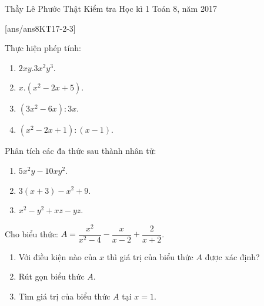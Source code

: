 \begin{name}
{Thầy  Lê Phước Thật}
{Kiểm tra Học kì 1 Toán 8, năm 2017}
\end{name}
\setcounter{ex}{0}
[ans/ans8KT17-2-3]

\begin{ex}%
Thực hiện phép tính:
\begin{enumerate}
\item $2xy.3x^2y^3$.
\item $x.(x^2-2x+5)$.
\item $(3x^2-6x):3x$.
\item $(x^2-2x+1):(x-1)$.
\end{enumerate}
\end{ex}

\begin{ex}%
Phân tích các đa thức sau thành nhân tử:
\begin{enumerate}
\item $5x^2y-10xy^2$.
\item $3(x + 3)-x^2+9$.
\item $x^2-y^2+xz-yz$.
\end{enumerate}
\end{ex}

\begin{ex}%
Cho biểu thức: $A=\dfrac{x^2}{x^2-4}-\dfrac{x}{x-2}+\dfrac{2}{x+2}$.
\begin{enumerate}
\item Với điều kiện nào của $x$ thì giá trị của biểu thức $A$ được xác định?
\item Rút gọn biểu thức $A$.
\item Tìm giá trị của biểu thức $A$ tại $x=1$.
\end{enumerate}
\end{ex}

